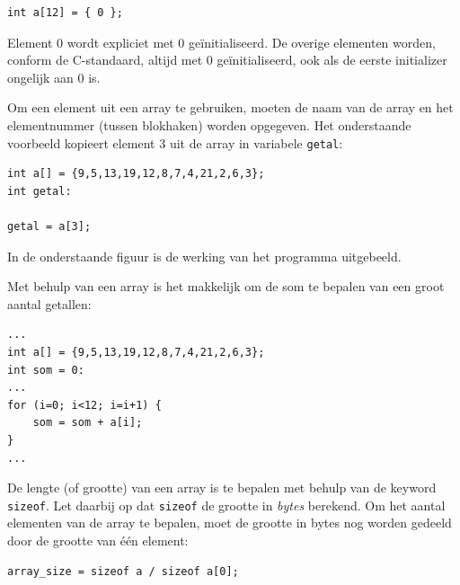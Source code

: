 \documentclass[a4paper,10pt,fleqn,twoside]{article}
\begin{document}
\begin{lstlisting}
int a[12] = { 0 };
\end{lstlisting}

Element 0 wordt expliciet met 0 ge\"initialiseerd. De overige elementen worden, conform de C-standaard, altijd met 0 ge\"initialiseerd, ook als de eerste initializer ongelijk aan 0 is.

Om een element uit een array te gebruiken, moeten de naam van de array en het elementnummer (tussen blokhaken) worden opgegeven. Het onderstaande voorbeeld kopieert element 3 uit de array in variabele \lstinline|getal|:

\begin{lstlisting}
int a[] = {9,5,13,19,12,8,7,4,21,2,6,3};
int getal:

getal = a[3];
\end{lstlisting}

In de onderstaande figuur is de werking van het programma uitgebeeld.

\begin{figure}[!ht]
\centering
{}
\end{figure}

Met behulp van een array is het makkelijk om de som te bepalen van een groot aantal getallen:

\begin{lstlisting}
...
int a[] = {9,5,13,19,12,8,7,4,21,2,6,3};
int som = 0:
...
for (i=0; i<12; i=i+1) {
	som = som + a[i];
}
...
\end{lstlisting}

De lengte (of grootte) van een array is te bepalen met behulp van de keyword \lstinline|sizeof|. Let daarbij op dat \lstinline|sizeof| de grootte in \textsl{bytes} berekend. Om het aantal elementen van de array te bepalen, moet de grootte in bytes nog worden gedeeld door de grootte van \'e\'en element:

\begin{lstlisting}
array_size = sizeof a / sizeof a[0];
\end{lstlisting}
\end{document}
